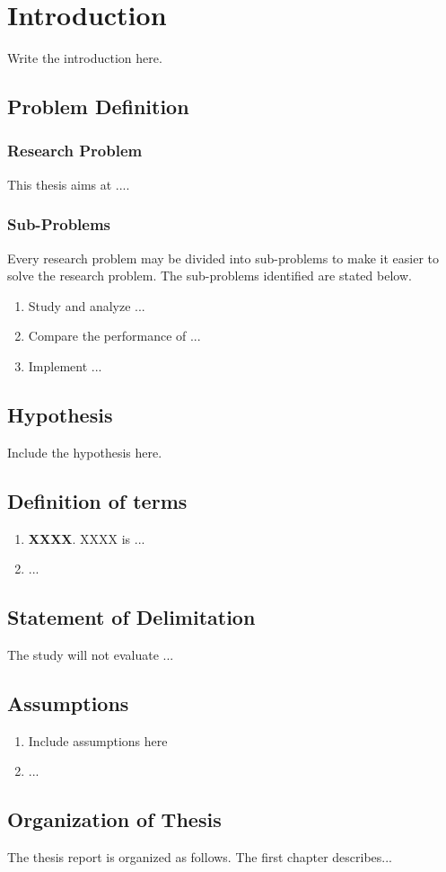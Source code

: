 
\chapter{Introduction}\label{chapter:Introduction}
\indent Write the introduction here.

\newpage
\section{Problem Definition}\label{section:Problem}
\subsection{Research Problem}
This thesis aims at ....
\subsection{Sub-Problems}
Every research problem may be divided into sub-problems to make it easier to solve the research problem. The sub-problems identified are stated below.

	\begin{enumerate}
    	\item Study and analyze ...
    	\item Compare the performance of ...
    	\item Implement ...
  	\end{enumerate}

\section{Hypothesis}\label{section:Hypothesis}
Include the hypothesis here.

\section{Definition of terms} \label{section:Definition of terms}
\begin{enumerate}
\item \textbf{XXXX}. XXXX is ...
\item ...
\end{enumerate}

\section{Statement of Delimitation}\label{section:Statement of Delimitation}
The study will not evaluate ...

\section{Assumptions}\label{section:Assumptions}
\begin{enumerate}
\item  Include assumptions here
\item ...
\end{enumerate}


\section{Organization of Thesis}\label{section:Organization of Thesis}

\indent The thesis report is organized as follows. The first chapter describes...
